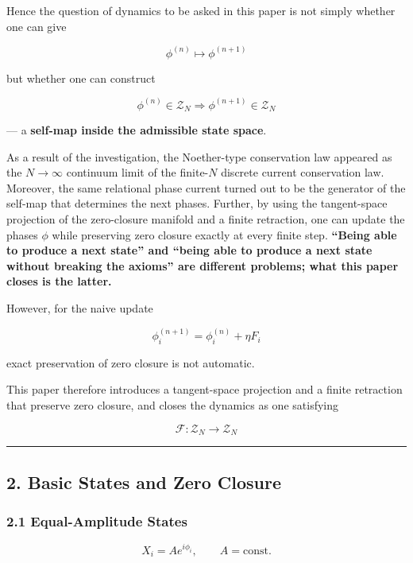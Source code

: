 \documentclass[
  a4paper,
]{article}
\begin{document}
Hence the question of dynamics to be asked in this paper is not simply
whether one can give

\[
\phi^{(n)}\mapsto\phi^{(n+1)}
\]

but whether one can construct

\[
\boxed{
\phi^{(n)}\in\mathcal Z_N
\Longrightarrow
\phi^{(n+1)}\in\mathcal Z_N
}
\]

--- a \textbf{self-map inside the admissible state space}.

As a result of the investigation, the Noether-type conservation law
appeared as the \(N\to\infty\) continuum limit of the finite-\(N\)
discrete current conservation law. Moreover, the same relational phase
current turned out to be the generator of the self-map that determines
the next phases. Further, by using the tangent-space projection of the
zero-closure manifold and a finite retraction, one can update the phases
\(\phi\) while preserving zero closure exactly at every finite step.
\textbf{``Being able to produce a next state'' and ``being able to
produce a next state without breaking the axioms'' are different
problems; what this paper closes is the latter.}

However, for the naive update

\[
\phi_i^{(n+1)}
=
\phi_i^{(n)}
+
\eta F_i
\]

exact preservation of zero closure is not automatic.

This paper therefore introduces a tangent-space projection and a finite
retraction that preserve zero closure, and closes the dynamics as one
satisfying

\[
\boxed{
\mathcal F:
\mathcal Z_N\to\mathcal Z_N
}
\]

\begin{center}\rule{0.5\linewidth}{0.5pt}\end{center}

\subsection{2. Basic States and Zero
Closure}\label{basic-states-and-zero-closure}

\subsubsection{2.1 Equal-Amplitude States}\label{equal-amplitude-states}

\[
\boxed{
X_i=Ae^{i\phi_i},
\qquad
A=\mathrm{const.}
}
\tag{1}
\]
\end{document}
